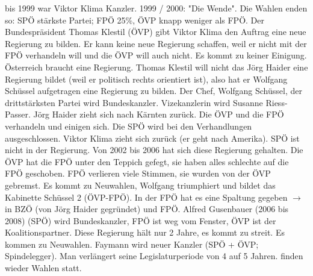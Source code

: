 \documentclass[a4paper,final]{report}
\begin{document}
\newline
{} bis 1999 war Viktor Klima Kanzler. 1999 / 2000: "Die Wende". Die Wahlen enden so: SPÖ stärkste Partei; FPÖ 25\%, ÖVP knapp weniger als FPÖ.
Der Bundespräsident Thomas Klestil (ÖVP) gibt Viktor Klima den Auftrag eine neue Regierung zu bilden. Er kann keine neue Regierung schaffen, weil er nicht mit der FPÖ verhandeln will und die ÖVP will auch nicht. Es kommt zu keiner Einigung.
\newline
\newline
Österreich braucht eine Regierung. Thomas Klestil will nicht das Jörg Haider eine Regierung bildet (weil er politisch rechts orientiert ist), also hat er Wolfgang Schüssel aufgetragen eine Regierung zu bilden. Der Chef, Wolfgang Schüssel, der drittstärksten Partei wird Bundeskanzler. Vizekanzlerin wird Susanne Riess-Passer. Jörg Haider zieht sich nach Kärnten zurück. 
\newline
\newline
Die ÖVP und die FPÖ verhandeln und einigen sich. Die SPÖ wird bei den Verhandlungen ausgeschlossen. Viktor Klima zieht sich zurück (er geht nach Amerika). SPÖ ist nicht in der Regierung.
\newline
\newline
Von 2002 bis 2006 hat sich diese Regierung gehalten. Die ÖVP hat die FPÖ unter den Teppich gefegt, sie haben alles schlechte auf die FPÖ geschoben. FPÖ verlieren viele Stimmen, sie wurden von der ÖVP gebremst. Es kommt zu Neuwahlen, Wolfgang triumphiert und bildet das Kabinette Schüssel 2 (ÖVP-FPÖ). In der FPÖ hat es eine Spaltung gegeben $\rightarrow$ in BZÖ (von Jörg Haider gegründet) und FPÖ.
\newline
\newline
Alfred Gusenbauer (2006 bis 2008) (SPÖ) wird Bundeskanzler, FPÖ ist weg vom Fenster, ÖVP ist der Koalitionspartner. 
Diese Regierung hält nur 2 Jahre, es kommt zu streit. Es kommen zu Neuwahlen. Faymann wird neuer Kanzler (SPÖ + ÖVP; Spindelegger). Man verlängert seine Legislaturperiode von 4 auf 5 Jahren.
 finden wieder Wahlen statt.
\end{document}

